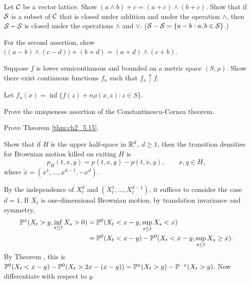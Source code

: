 \begin{exercise}\label{ex:ch2_39}
Let $\CC$ be a vector lattice. Show $(a \wedge b) + c = (a + c) \wedge (b + c)$. Show that if $\SC$ is a subset of $\CC$ that is closed under addition and under the operation $\wedge$, then $\SC - \SC$ is closed under the operations $\wedge$ and $\vee$. ($\SC - \SC = \{a - b : a,b \in \SC\}$.)

\hint For the second assertion, show $\big((a - b) \wedge (c - d)\big) + (b + d) = (a + d) \wedge (c + b)$.
\end{exercise}

\begin{exercise}\label{ex:ch2_40}
Suppose $f$ is lower semicontinuous and bounded on a metric space $(S,\rho)$. Show there exist continuous functions $f_n$ such that $f_n \uparrow f$.

\hint Let $f_n(x) = \inf\{f(z) + n\rho(x,z) : z \in S\}$.
\end{exercise}

\begin{exercise}\label{ex:ch2_41}
Prove the uniqueness assertion of the Constantinescu-Cornea theorem.
\end{exercise}

\begin{exercise}\label{ex:ch2_42}
Prove Theorem \ref{thm:ch2_5.15}.
\end{exercise}

\begin{exercise}\label{ex:ch2_43}
Show that if $H$ is the upper half-space in $\R^d$, $d \geq 1$, then the transition densities for Brownian motion killed on exiting $H$ is
\[
    p_H(t,x,y) = p(t,x,y) - p(t,\widetilde{x},y), \qquad x,y \in H,
\]
where $\widetilde{x} = (x^1,\ldots,x^{d-1},-x^d)$.

\hint By the independence of $X_t^d$ and $(X_t^1,\ldots,X_t^{d-1})$, it suffices to consider the case $d = 1$. If $X_t$ is one-dimensional Brownian motion, by translation invariance and symmetry,
\begin{align*}
    \P^x(X_t > y, \inf_{s\leq t} X_s > 0) &= \P^0(X_t < x - y, \sup_{s\leq t} X_s < x) \\
    &= \P^0(X_t < x - y) - \P^0(X_t < x - y, \sup_{s\leq t} X_s \geq x).
\end{align*}
By Theorem , this is $\P^0(X_t < x-y)-\P^0(X_t > 2x-(x-y)) = \P^x(X_t > y) - \P^{-x}(X_t > y)$. Now differentiate with respect to $y$.
\end{exercise}

